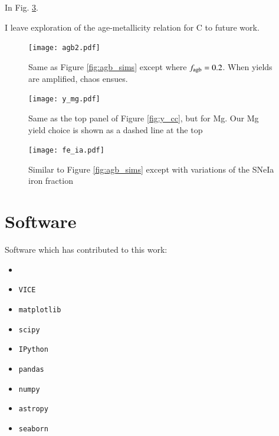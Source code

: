 \documentclass[12pt,oneside]{report}
\newcommand{\VICE}{\texttt{VICE}}
\begin{document}
In Fig. \ref{fig:fe_ia}.

I leave exploration of the age-metallicity relation for C to future work.


\begin{figure}[htp]
    \centering
    \texttt{[image: agb2.pdf]}

    \caption[Alternate AGB models]{Same as Figure \ref{fig:agb_sims} except where $f_{\rm agb}=0.2$. When yields are amplified, chaos ensues.}
    \label{fig:fagb2}
\end{figure}


\begin{figure}
    \centering
    \texttt{[image: y\_mg.pdf]}
    \caption[Magnesium CCSNe yields]{Same as the top panel of Figure \ref{fig:y_cc}, but for Mg. Our Mg yield choice is shown as a dashed line at the top
    }
    \label{fig:y_mg}
\end{figure}

\begin{figure}
    \centering
    \texttt{[image: fe\_ia.pdf]}
    \caption[Adjusting type Ia iron]{Similar to Figure \ref{fig:agb_sims} except with variations of the SNeIa iron fraction}
    \label{fig:fe_ia}
\end{figure}




\newpage

\section{Software}

Software which has contributed to this work:

\begin{itemize}
    \item \citet{OhioSupercomputerCenter1987}
    \item \VICE~\citep{JW20, james+21}
    \item \texttt{matplotlib} \citep{matplotlib}
    \item \texttt{scipy} \citep{scipy}
    \item \texttt{IPython} \citep{ipy}
    \item \texttt{pandas} \citep{pandas}
    \item \texttt{numpy} \citep{numpy}
    \item \texttt{astropy} \citep{astropy:2013, astropy:2018, astropy:2022}
    \item \texttt{seaborn}
\end{itemize}
\end{document}
